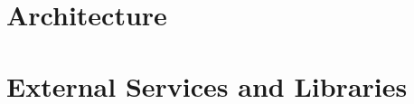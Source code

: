 \clearpage
{\section{Architecture}}
\label{sect:architecture}


\clearpage
{\section{External Services and Libraries}}
\label{sect:extservices}


